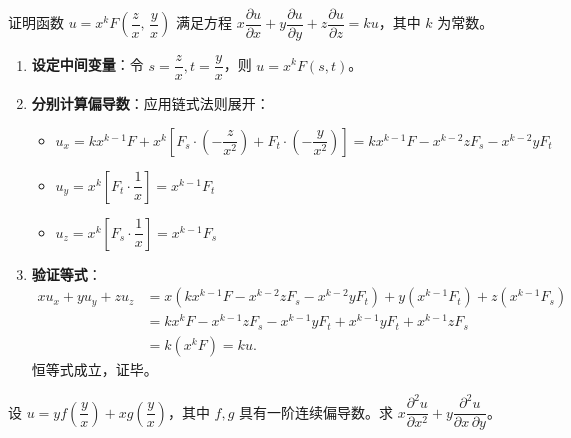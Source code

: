 \documentclass[lang=cn,11pt]{elegantbook}
\begin{document}

\begin{exercise}
证明函数 $u=x^k F\!\left(\dfrac{z}{x},\,\dfrac{y}{x}\right)$ 满足方程 $x\dfrac{\partial u}{\partial x}+y\dfrac{\partial u}{\partial y}+z\dfrac{\partial u}{\partial z}=ku$，其中 $k$ 为常数。
\end{exercise}

\begin{solution}
\begin{enumerate}
  \item \textbf{设定中间变量}：令 $s = \dfrac{z}{x}, t = \dfrac{y}{x}$，则 $u = x^k F(s,t)$。
  \item \textbf{分别计算偏导数}：应用链式法则展开：
  \begin{itemize}
    \item $u_x = kx^{k-1}F + x^k \left[F_s \cdot \left(-\dfrac{z}{x^2}\right) + F_t \cdot \left(-\dfrac{y}{x^2}\right)\right] = kx^{k-1}F - x^{k-2}z F_s - x^{k-2}y F_t$
    \item $u_y = x^k \left[ F_t \cdot \dfrac{1}{x} \right] = x^{k-1} F_t$
    \item $u_z = x^k \left[ F_s \cdot \dfrac{1}{x} \right] = x^{k-1} F_s$
  \end{itemize}
  \item \textbf{验证等式}：
  \begin{align*}
  x u_x + y u_y + z u_z &= x(kx^{k-1}F - x^{k-2}z F_s - x^{k-2}y F_t) + y(x^{k-1} F_t) + z(x^{k-1} F_s) \\[6pt]
  &= kx^k F - x^{k-1}z F_s - x^{k-1}y F_t + x^{k-1}y F_t + x^{k-1}z F_s \\[6pt]
  &= k(x^k F) = ku.
  \end{align*}
  恒等式成立，证毕。
\end{enumerate}
\end{solution}



\begin{exercise}[混合偏导数的链式法则]
设 $u=yf\!\left(\dfrac{y}{x}\right)+xg\!\left(\dfrac{y}{x}\right)$，其中 $f,g$ 具有一阶连续偏导数。求 $x\dfrac{\partial^2 u}{\partial x^2}+y\dfrac{\partial^2 u}{\partial x\,\partial y}$。
\end{exercise}
\end{document}
